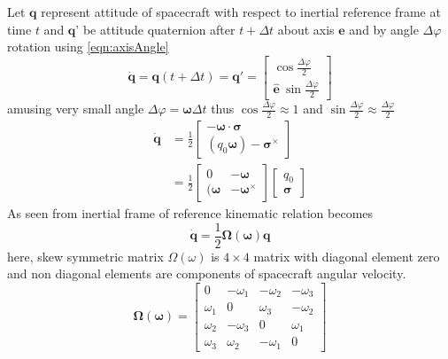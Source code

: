 Let $\displaystyle \mathbf{q}$ represent attitude of spacecraft with respect to inertial reference frame at time $\displaystyle t$ and $\displaystyle \mathbf{q}$' be attitude quaternion after $\displaystyle t+\Delta t$ about axis $\displaystyle \hat{\mathbf{e}}$ and by angle $\displaystyle \Delta \varphi $ rotation using \autoref{eqn:axisAngle}
\begin{equation}
\dot{\mathbf{q}} =\mathbf{q}( t+\Delta t) =\mathbf{q} '=\begin{bmatrix}
\cos\frac{\Delta \varphi }{2}\\
\hat{\mathbf{e}} \ \sin\frac{\Delta \varphi }{2}
\end{bmatrix}
\end{equation}
amusing very small angle $\displaystyle \Delta \varphi =\mathbf{\omega } \Delta t$ thus $\displaystyle \cos\frac{\Delta \varphi }{2} \approx 1$ and $\displaystyle \sin\frac{\Delta \varphi }{2} \approx \frac{\Delta \varphi }{2}$
\begin{equation}
\begin{aligned}
\dot{\mathbf{q}} & =\frac{1}{2}\begin{bmatrix}
-\mathbf{\omega } \cdot \mathbf{\sigma }\\
( q_{0}\mathbf{\omega }) -\mathbf{\sigma }^{\times }
\end{bmatrix}\\
 & =\frac{1}{2}\begin{bmatrix}
0 & -\mathbf{\omega }\\
(\mathbf{\omega } & -\mathbf{\omega }^{\times }
\end{bmatrix}\begin{bmatrix}
q_{0}\\
\mathbf{\sigma }
\end{bmatrix}
\end{aligned}
\end{equation}
As seen from inertial frame of reference kinematic relation becomes
\begin{equation}
\dot{\mathbf{q}} =\frac{1}{2}\mathbf{\Omega }(\mathbf{\omega })\mathbf{q}
\end{equation}
here, skew symmetric matrix $\Omega(\omega)$ is $4\times4$ matrix with diagonal element zero and non diagonal elements are components of spacecraft angular velocity.
\begin{equation*}
\mathbf{\Omega }(\mathbf{\omega }) =\begin{bmatrix}
0 & -\omega _{1} & -\omega _{2} & -\omega _{3}\\
\omega _{1} & 0 & \omega _{3} & -\omega _{2}\\
\omega _{2} & -\omega _{3} & 0 & \omega _{1}\\
\omega _{3} & \omega _{2} & -\omega _{1} & 0
\end{bmatrix}
\end{equation*}